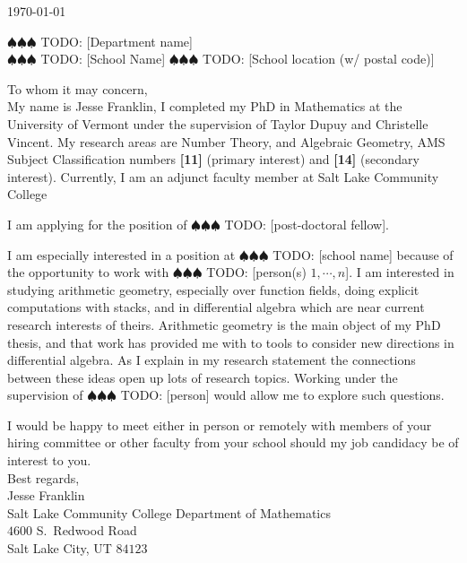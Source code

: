 \documentclass[12pt]{article}
\newcommand{\todo}[1]{{\color{purple} \sf $\spadesuit\spadesuit\spadesuit$ TODO: [#1]}}
\begin{document}
	
	\noindent
	\today
	
	\vspace{12pt}
	\noindent
	\todo{Department name}\\
	\todo{School Name}
	\todo{School location (w/ postal code)}
	\vspace{24pt}
	
	\noindent
	To whom it may concern,\\
	
	My name is Jesse Franklin, I completed my PhD in Mathematics at the University of Vermont under the supervision of Taylor Dupuy and Christelle Vincent. My research areas are Number Theory, and Algebraic Geometry, AMS Subject Classification numbers \textbf{[11]} (primary interest) and \textbf{[14]} (secondary interest). Currently, I am an adjunct faculty member at Salt Lake Community College
	
	I am applying for the position of \todo{post-doctoral fellow}.
	
	I am especially interested in a position at \todo{school name} because of the opportunity to work with \todo{person(s) $1,\cdots, n$}. I am interested in studying arithmetic geometry, especially over function fields, doing explicit computations with stacks, and in differential algebra which are near current research interests of theirs. Arithmetic geometry is the main object of my PhD thesis, and that work has provided me with to tools to consider new directions in differential algebra. As I explain in my research statement the connections between these ideas open up lots of research topics. Working under the supervision of \todo{person} would allow me to explore such questions. 
	
	I would be happy to meet either in person or remotely with members of your hiring committee or other faculty from your school should my job candidacy be of interest to you.\\
	
	\noindent
	Best regards,\\
	
	\vspace{12pt}
	\noindent
	Jesse Franklin\\
	Salt Lake Community College
	Department of Mathematics\\
	$4600$ S.\ Redwood Road\\
	Salt Lake City, UT $84123$
	
	
	
\end{document}
